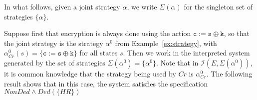 \documentclass[a4wide]{article}
\theoremstyle{examplesty}
\newcommand{\I}{\mathcal{I}}
\newcommand{\Crypt}{Cr}
\begin{document}
In what follows, given a joint strategy $\alpha$, we write
$\Sigma(\alpha)$ for the singleton set of strategies $\{\alpha\}$. 

Suppose first that  encryption is always done 
using the action $\mathtt{c}:=\mathtt{s} \oplus \mathtt{k}$, 
so that the joint strategy is the strategy $\alpha^0$ from Example~\ref{ex:strategy}, with 
$\alpha^0_{\Crypt}(s) = \{\mathtt{c}:=\mathtt{s} \oplus \mathtt{k}\}$ for all states $s$. 
Then we work in the interpreted system generated by the set of strategies $\Sigma(\alpha^0) = \{\alpha^0\}$. 
Note that in $\I(E,\Sigma(\alpha^0))$, it is common knowledge that the strategy being used by $\Crypt$ is $\alpha^0_{\Crypt}$. 
The following result shows that in this case, the system satisfies the specification $\mathit{NonDed} \land \mathit{Ded}(\{HR\})$
\end{document}
